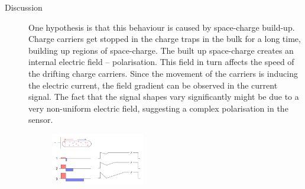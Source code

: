 \begin{description}
\item[Discussion] 

One hypothesis is that this behaviour is caused by space-charge build-up. Charge carriers get stopped in the charge traps in the bulk for a long time, building up regions of space-charge. The built up space-charge creates an internal electric field -- polarisation. This field in turn affects the speed of the drifting charge carriers. Since the movement of the carriers is inducing the electric current, the field gradient can be observed in the current signal. The fact that the signal shapes vary significantly might be due to a very non-uniform electric field, suggesting a complex polarisation in the sensor.
\begin{figure}[!t]
\begin{center}
\includegraphics[width=0.4\textwidth]{03_measurement_results/plots/elfield}

\end{center}
\end{figure}
\end{description}
